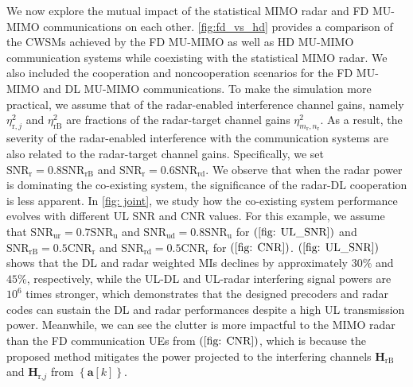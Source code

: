 \documentclass[9pt,journal]{IEEEtran}
\newcommand{\paren}[1]{\left({#1}\right)}
\newcommand{\bracket}[1]{{\left [{#1}\right ]}}
\newcommand{\braces}[1]{{\left\{ {#1}\right\}}}
\newcommand{\rr}{_\mathrm{r}}
\newcommand{\B}{\textrm{B}}
\begin{document}
We now explore the mutual impact of the statistical MIMO radar and FD MU-MIMO communications on each other. \figurename{\;\ref{fig:fd_vs_hd}} provides a comparison of the CWSMs achieved by the FD MU-MIMO as well as HD MU-MIMO communication systems while coexisting with the statistical MIMO radar. We also included the cooperation and noncooperation scenarios for the FD MU-MIMO and DL MU-MIMO communications. To make the simulation more practical, we assume that of the radar-enabled interference channel gains, namely $\eta^2_{\mathrm{r},j}$ and $\eta^2_{\mathrm{rB}}$ are fractions of the radar-target channel gains $\eta^2_{m\rr,n\rr}$. As a result, the severity of the radar-enabled interference with the communication systems are also related to the radar-target channel gains. Specifically, we set $\mathrm{SNR}_{\textrm{r}}=0.8\mathrm{SNR}_{\textrm{rB}}$ and $\mathrm{SNR}_{\textrm{r}}=0.6\mathrm{SNR}_{\textrm{rd}}$. We observe that when the radar power is dominating the co-existing system, the significance of the radar-DL cooperation is less apparent. In \figurename{\;\ref{fig: joint}}, we study how the co-existing system performance evolves with different UL SNR and CNR values.  %
For this example, we assume that $\mathrm{SNR}_{\textrm{ur}}=0.7\mathrm{SNR}_{\textrm{u}}$ and  $\mathrm{SNR}_{\textrm{ud}}=0.8\mathrm{SNR}_{\textrm{u}}$ for \figurename{\;$\paren{\mathrm{\ref{fig: UL_SNR}}}$}  and $\mathrm{SNR}_{\textrm{rB}}=0.5\mathrm{CNR}_{\textrm{r}}$ and $\mathrm{SNR}_{\textrm{rd}}=0.5\mathrm{CNR}_{\textrm{r}}$ for \figurename{\;$\paren{\mathrm{\ref{fig: CNR}}}$}.  \figurename{\;$\paren{\mathrm{\ref{fig: UL_SNR}}}$} shows that the DL and radar weighted MIs declines by approximately $30\%$ and $45\%$, respectively, while the UL-DL and UL-radar interfering signal powers are $10^6$ times stronger, which demonstrates that the designed precoders and radar codes can sustain the DL and radar performances despite a high UL transmission power. Meanwhile, we can see the clutter is more impactful to the MIMO radar than the FD communication UEs from \figurename{\;$\paren{\mathrm{\ref{fig: CNR}}}$}, which is because the proposed method mitigates the power projected to the interfering channels $\mathbf{H}_{\textrm{rB}}$ and $\mathbf{H}_{\textrm{r,}j}$ from $\braces{\mathbf{a}\bracket{k}}$.
\vspace{-1em}
\end{document}
